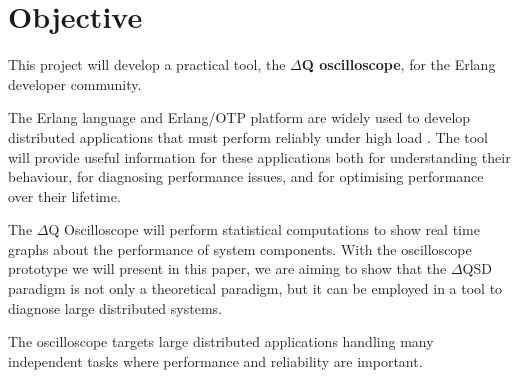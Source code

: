 \section{Objective}
         This project will develop a practical tool, the \textbf{$\Delta$Q oscilloscope}, for the Erlang developer community. 
    
    The Erlang language and Erlang/OTP platform are widely used to develop distributed applications that must perform reliably under high load \cite{erl}. The tool will provide useful information for these applications both for understanding their behaviour, for diagnosing performance issues, and for optimising performance over their lifetime. \cite{post}

    The $\Delta$Q Oscilloscope will perform statistical computations to show real time graphs about the performance of system components. With the oscilloscope prototype we will present in this paper, we are aiming to show that the $\Delta$QSD paradigm is not only a theoretical paradigm, but it can be employed in a tool to diagnose large distributed systems.  
 
    The oscilloscope targets large distributed applications handling many independent tasks where performance and reliability are important. \cite{dq-tut}
    


